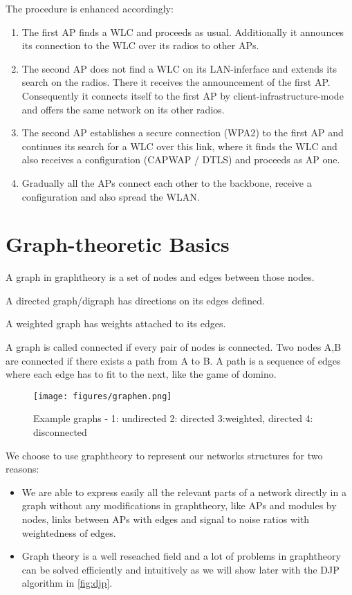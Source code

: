 	The procedure is enhanced accordingly:
	
	\begin{enumerate}
	  \item The first \ac{AP} finds a \ac{WLC} and proceeds as usual. Additionally it announces its connection to the \ac{WLC} over its radios to other APs.
	  
	  \item The second \ac{AP} does not find a \ac{WLC} on its \ac{LAN}-inferface and extends its search on the radios. 
	    There it receives the announcement of the first \ac{AP}.
	    Consequently it connects itself to the first AP by client-infrastructure-mode and offers the same network on its other radios.
	    
	  \item The second \ac{AP} establishes a secure connection (\ac{WPA2}) to the first \ac{AP} and continues its search for a \ac{WLC} over this link, 
	    where it finds the \ac{WLC} and also receives a configuration (\ac{CAPWAP} / \ac{DTLS}) and proceeds as \ac{AP} one.
	    
	  \item Gradually all the APs connect each other to the backbone, receive a configuration and also spread the \ac{WLAN}.
	\end{enumerate}
	
\section{Graph-theoretic Basics}
  A graph in graphtheory is a set of nodes and edges between those nodes. 
  
  A directed graph/digraph has directions on its edges defined.
  
  A weighted graph has weights attached to its edges.
  
  A graph is called connected if every pair of nodes is connected. 
  Two nodes A,B are connected if there exists a path from A to B.
  A path is a sequence of edges where each edge has to fit to the next, like the game of domino.
  
  \begin{figure}[th!]
    \centering
    \texttt{[image: figures/graphen.png]}
    \caption{Example graphs - 1: undirected 2: directed 3:weighted, directed 4: disconnected}
    \label{fig:graphen}
  \end{figure}

  We choose to use graphtheory to represent our networks structures for two reasons:
  \begin{itemize}
   \item We are able to express easily all the relevant parts of a network directly in a graph without any modifications in graphtheory,  
   like APs and modules by nodes, links between APs with edges and signal to noise ratios with weightedness of edges. 
    
   \item Graph theory is a well reseached field and a lot of problems in graphtheory can be solved efficiently and intuitively 
    as we will show later with the \ac{DJP} algorithm in \ref{fig:djp}.
  \end{itemize}
    
